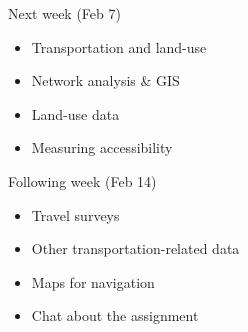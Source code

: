 \documentclass[aspectratio=169]{beamer}
\begin{document}



\begin{frame}
	
	Next week (Feb 7)
	
	\begin{itemize}
		\item Transportation and land-use
		\item Network analysis \& GIS
		\item Land-use data
		\item Measuring accessibility
	\end{itemize}

	Following week (Feb 14)
	
	\begin{itemize}
		\item Travel surveys
		\item Other transportation-related data
		\item Maps for navigation
		\item Chat about the assignment
	\end{itemize}
	
\end{frame}
\end{document}
